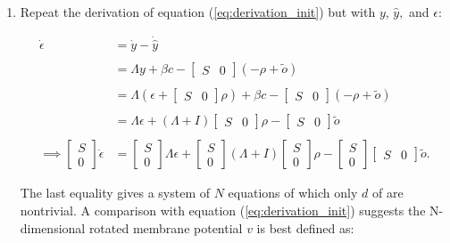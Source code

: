 \begin{enumerate}
\item Repeat the derivation of equation (\ref{eq:derivation_init}) but with $y$, $\hat{y},$ and $\epsilon$:

\begin{align*}
\dot{\epsilon}
&=
\dot{y} - \dot{\hat{y}}
\\
\\
&= 
\Lambda y + \beta c - 
\begin{bmatrix}
S & 0
\end{bmatrix}
\left(
-\rho + \tilde{o}
\right)
\\
\\
&= 
\Lambda \left(
\epsilon + 
\begin{bmatrix}
S & 0
\end{bmatrix}
\rho
\right)
+ 
\beta c
-
\begin{bmatrix}
S & 0
\end{bmatrix}
\left(
-\rho + \tilde{o}
\right)
\\
\\
&= 
\Lambda \epsilon
+
\left( 
\Lambda + I
\right)
\begin{bmatrix}
S & 0
\end{bmatrix}
\rho
-
\begin{bmatrix}
S & 0
\end{bmatrix}
\tilde{o}
\\
\\
\implies
\begin{bmatrix}
S \\ 0
\end{bmatrix}
\dot{\epsilon}
&= 
\begin{bmatrix}
S \\ 0
\end{bmatrix}
\Lambda \epsilon
+
\begin{bmatrix}
S \\ 0
\end{bmatrix}
\left( 
\Lambda + I
\right)
\begin{bmatrix}
S \\ 0
\end{bmatrix}
\rho
-
\begin{bmatrix}
S \\ 0
\end{bmatrix}
\begin{bmatrix}
S & 0
\end{bmatrix}
\tilde{o}.
\end{align*}

The last equality gives a system of $N$ equations of which only $d$ of are nontrivial. A comparison with equation (\ref{eq:derivation_init}) suggests the N-dimensional rotated membrane potential $v$ is best defined as:


\end{enumerate}
